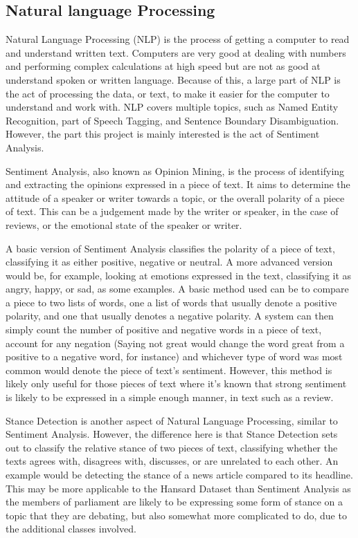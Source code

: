 \subsection{Natural language Processing}
\label{sec:bck_NLP}
Natural Language Processing (NLP) is the process of getting a computer to read and understand written text. Computers are very good at dealing with numbers and performing complex calculations at high speed but are not as good at understand spoken or written language. Because of this, a large part of NLP is the act of processing the data, or text, to make it easier for the computer to understand and work with. NLP covers multiple topics, such as Named Entity Recognition, part of Speech Tagging, and Sentence Boundary Disambiguation. However, the part this project is mainly interested is the act of Sentiment Analysis.

Sentiment Analysis, also known as Opinion Mining, is the process of identifying and extracting the opinions expressed in a piece of text. It aims to determine the attitude of a speaker or writer towards a topic, or the overall polarity of a piece of text. This can be a judgement made by the writer or speaker, in the case of reviews, or the emotional state of the speaker or writer.

A basic version of Sentiment Analysis classifies the polarity of a piece of text, classifying it as either positive, negative or neutral. A more advanced version would be, for example, looking at emotions expressed in the text, classifying it as angry, happy, or sad, as some examples. A basic method used can be to compare a piece to two lists of words, one a list of words that usually denote a positive polarity, and one that usually denotes a negative polarity. A system can then simply count the number of positive and negative words in a piece of text, account for any negation (Saying not great would change the word great from a positive to a negative word, for instance) and whichever type of word was most common would denote the piece of text’s sentiment. However, this method is likely only useful for those pieces of text where it’s known that strong sentiment is likely to be expressed in a simple enough manner, in text such as a review.  

Stance Detection is another aspect of Natural Language Processing, similar to Sentiment Analysis. However, the difference here is that Stance Detection sets out to classify the relative stance of two pieces of text, classifying whether the texts agrees with, disagrees with, discusses, or are unrelated to each other. An example would be detecting the stance of a news article compared to its headline. This may be more applicable to the Hansard Dataset than Sentiment Analysis as the members of parliament are likely to be expressing some form of stance on a topic that they are debating, but also somewhat more complicated to do, due to the additional classes involved.

